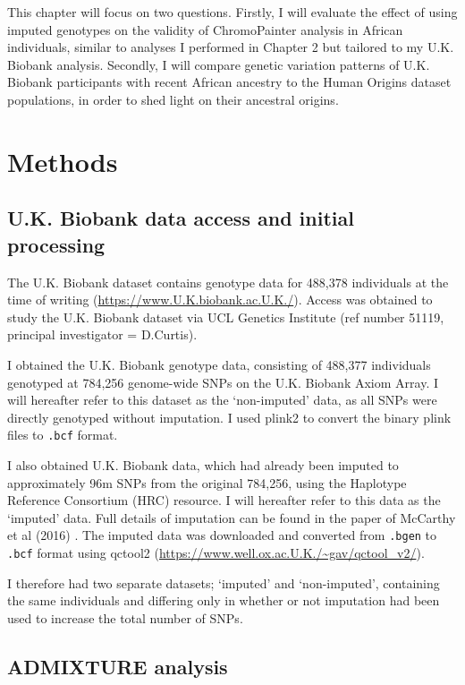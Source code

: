 This chapter will focus on two questions. Firstly, I will evaluate the effect of using imputed genotypes on the validity of ChromoPainter analysis in African individuals, similar to analyses I performed in Chapter 2 but tailored to my U.K. Biobank analysis. Secondly, I will compare genetic variation patterns of U.K. Biobank participants with recent African ancestry to the Human Origins dataset populations, in order to shed light on their ancestral origins.

\section{Methods}

\subsection{U.K. Biobank data access and initial processing}

The U.K. Biobank dataset contains genotype data for 488,378 individuals at the time of writing (\url{https://www.U.K.biobank.ac.U.K./}). Access was obtained to study the U.K. Biobank dataset via UCL Genetics Institute (ref number 51119, principal investigator = D.Curtis). 

I obtained the U.K. Biobank genotype data, consisting of 488,377 individuals genotyped at 784,256 genome-wide SNPs on the U.K. Biobank Axiom Array. I will hereafter refer to this dataset as the `non-imputed' data, as all SNPs were directly genotyped without imputation. I used plink2 \cite{purcell2007plink} to convert the binary plink files to \texttt{.bcf} format. 

I also obtained U.K. Biobank data, which had already been imputed to approximately 96m SNPs from the original 784,256, using the  Haplotype Reference Consortium (HRC) resource. I will hereafter refer to this data as the `imputed' data. Full details of imputation can be found in the paper of McCarthy et al (2016) \cite{mccarthy2016reference}. The imputed data was downloaded and converted from \texttt{.bgen} to \texttt{.bcf} format using qctool2 (\url{https://www.well.ox.ac.U.K./~gav/qctool_v2/}). 

I therefore had two separate datasets; `imputed' and `non-imputed', containing the same individuals and differing only in whether or not imputation had been used to increase the total number of SNPs.

\subsection{ADMIXTURE analysis}


